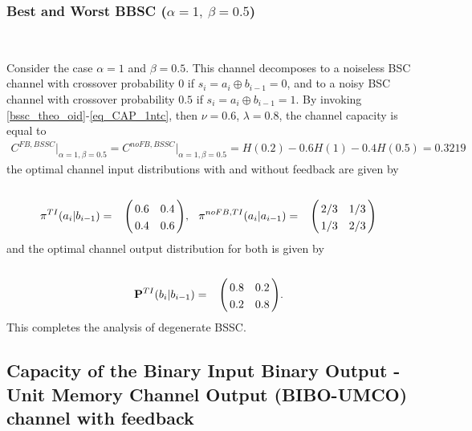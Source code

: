 \documentclass[11pt, a4paper, journal,onecolumn]{IEEEtran}
\let\bbordermatrix\bordermatrix
\newcommand{\bea}{\begin{eqnarray}}
\newcommand{\eea}{\end{eqnarray}}
\newcommand{\hso}{\hspace{.1in}}
\begin{document}
\subsubsection{ Best and Worst BBSC (${\alpha}=1, \ {\beta}=0.5$)} \
\par Consider the case  ${\alpha}=1$ and ${\beta}=0.5$. This channel decomposes to a  noiseless BSC channel with crossover probability $0$ if $s_i=a_i\oplus b_{i-1}=0$, and to  a  noisy BSC channel with crossover probability $0.5$ if $s_i=a_i\oplus b_{i-1}=1$. By invoking \eqref{bssc_theo_oid}-\eqref{eq_CAP_1ntc}, then  $\nu=0.6$,
$\lambda=0.8$, the channel capacity is equal to
\bea
C^{FB, BSSC}\Big|_{\alpha=1, \beta=0.5}=C^{noFB, BSSC}\Big|_{\alpha=1, \beta=0.5}=H(0.2)-{0.6}H(1)-{0.4}H(0.5)=0.3219 \nonumber
\eea
the optimal channel  input distributions with and without feedback are given by
\vspace{-0.6cm}
\bea
\pi^{TI}(a_i|b_{i-1}) = \bbordermatrix{~ \cr
                  & 0.6 & 0.4 \cr
                  & 0.4 & 0.6 \cr}, \hso 
{\pi}^{noFB, TI}(a_i|a_{i-1}) = \bbordermatrix{~  \cr
                  & 2/3 & 1/3 \cr
                  & 1/3 & 2/3 \cr}\nonumber
\eea
and the optimal channel output distribution for both is given by
\bea
{\bf P}^{TI}(b_i|b_{i-1}) = \bbordermatrix{~ \cr
                  & 0.8 & 0.2 \cr
                  & 0.2 & 0.8 \cr} . \nonumber
\eea
This completes the analysis of degenerate BSSC.




\subsection{Capacity of the Binary Input Binary Output - Unit Memory Channel Output (BIBO-UMCO) channel with feedback}\label{subsec.DP.example}
\end{document}
